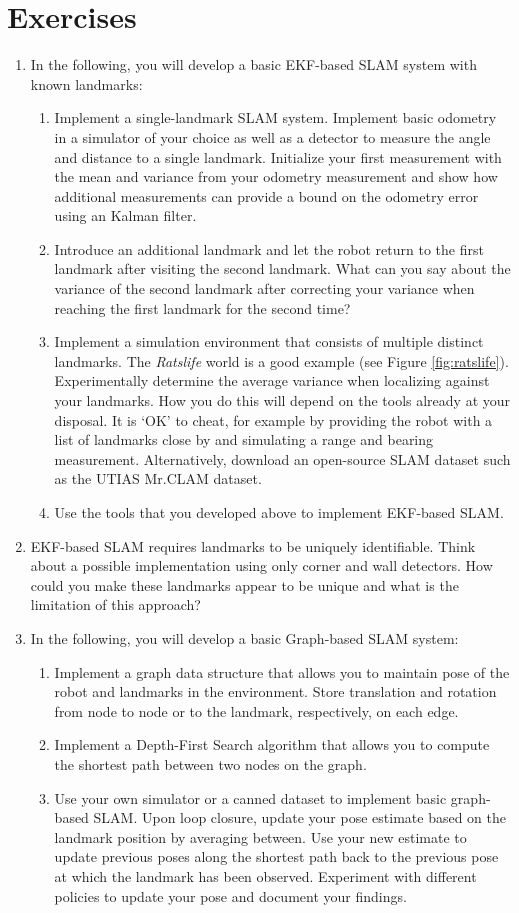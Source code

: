 \section*{Exercises}\small
\begin{enumerate}
\item In the following, you will develop a basic EKF-based SLAM system with known landmarks:
\begin{enumerate}
\item Implement a single-landmark SLAM system. Implement
basic odometry in a simulator of your choice as well as a detector to measure the angle and distance to a single landmark. Initialize your first measurement with the mean and variance from your odometry measurement and show how additional measurements can provide a bound on the odometry error using an Kalman filter. 
\item Introduce an additional landmark and let the robot  return to the first landmark after visiting the second landmark. What can you say about the variance of the second landmark after correcting your variance when reaching the first landmark for the second time?
\item Implement a simulation environment that consists of multiple distinct landmarks. The \emph{Ratslife} world is a good example (see Figure \ref{fig:ratslife}). Experimentally determine the average variance when localizing against your landmarks. How you do this will depend on the tools already at your disposal. It is `OK' to cheat, for example by providing the robot with a list of landmarks close by and simulating a range and bearing measurement. Alternatively, download an open-source SLAM dataset such as the UTIAS Mr.CLAM dataset.
\item Use the tools that you developed above to implement EKF-based SLAM.
\end{enumerate}
\item EKF-based SLAM requires landmarks to be uniquely identifiable. Think about a possible implementation using only corner and wall detectors. How could you make these landmarks appear to be unique and what is the limitation of this approach? 
\item In the following, you will develop a basic Graph-based SLAM system:
\begin{enumerate}
\item Implement a graph data structure that allows you to maintain pose of the robot and landmarks in the environment. Store translation and rotation from node to node or to the landmark, respectively, on each edge.
\item Implement a Depth-First Search algorithm that allows you to compute the shortest path between two nodes on the graph.
\item Use your own simulator or a canned dataset to implement basic graph-based SLAM. Upon loop closure, update your pose estimate based on the landmark position by averaging between. Use your new estimate to update previous poses along the shortest path back to the previous pose at which the landmark has been observed. Experiment with different policies to update your pose and document your findings. 
\end{enumerate}
\end{enumerate}

